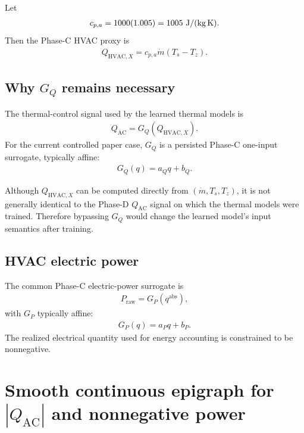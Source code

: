 \documentclass[11pt]{article}
\newcommand{\Ts}{T_s}
\newcommand{\Tz}{T_z}
\newcommand{\mdot}{\dot m}
\newcommand{\QAC}{Q_{\mathrm{AC}}}
\newcommand{\QHX}{Q_{\mathrm{HVAC},X}}
\begin{document}
Let
\begin{align}
c_{p,a}=1000(1.005)=1005\ {\rm J/(kg\,K)}.
\end{align}
Then the Phase-C HVAC proxy is
\begin{align}
\boxed{
\QHX
=
c_{p,a}\mdot(\Ts-\Tz).
}
\tag{6.21}
\end{align}

\subsection{Why \(G_Q\) remains necessary}

The thermal-control signal used by the learned thermal models is
\begin{align}
\boxed{
\QAC
=
G_Q(\QHX).
}
\tag{6.22}
\end{align}
For the current controlled paper case, \(G_Q\) is a persisted Phase-C one-input surrogate,
typically affine:
\begin{align}
G_Q(q)=a_Qq+b_Q.
\tag{6.23}
\end{align}

Although \(\QHX\) can be computed directly from \((\mdot,\Ts,\Tz)\), it is not generally
identical to the Phase-D \(\QAC\) signal on which the thermal models were trained.  Therefore
bypassing \(G_Q\) would change the learned model's input semantics after training.

\subsection{HVAC electric power}

The common Phase-C electric-power surrogate is
\begin{align}
\boxed{
P_{\mathrm{raw}}
=
G_P(q^{\mathrm{abs}}),
}
\tag{6.24}
\end{align}
with \(G_P\) typically affine:
\begin{align}
G_P(q)=a_Pq+b_P.
\tag{6.25}
\end{align}
The realized electrical quantity used for energy accounting is constrained to be nonnegative.

\section{Smooth continuous epigraph for \texorpdfstring{\(|\QAC|\)}{|QAC|} and nonnegative power}
\end{document}
